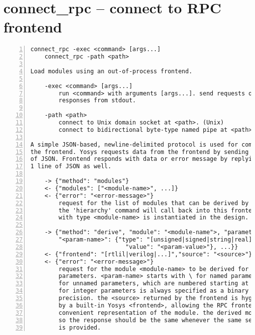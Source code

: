 \section{connect\_rpc -- connect to RPC frontend}
\label{cmd:connect_rpc}
\begin{lstlisting}[numbers=left,frame=single]
    connect_rpc -exec <command> [args...]
    connect_rpc -path <path>

Load modules using an out-of-process frontend.

    -exec <command> [args...]
        run <command> with arguments [args...]. send requests on stdin, read
        responses from stdout.

    -path <path>
        connect to Unix domain socket at <path>. (Unix)
        connect to bidirectional byte-type named pipe at <path>. (Windows)

A simple JSON-based, newline-delimited protocol is used for communicating with
the frontend. Yosys requests data from the frontend by sending exactly 1 line
of JSON. Frontend responds with data or error message by replying with exactly
1 line of JSON as well.

    -> {"method": "modules"}
    <- {"modules": ["<module-name>", ...]}
    <- {"error": "<error-message>"}
        request for the list of modules that can be derived by this frontend.
        the 'hierarchy' command will call back into this frontend if a cell
        with type <module-name> is instantiated in the design.

    -> {"method": "derive", "module": "<module-name">, "parameters": {
        "<param-name>": {"type": "[unsigned|signed|string|real]",
                           "value": "<param-value>"}, ...}}
    <- {"frontend": "[rtlil|verilog|...]","source": "<source>"}}
    <- {"error": "<error-message>"}
        request for the module <module-name> to be derived for a specific set of
        parameters. <param-name> starts with \ for named parameters, and with $
        for unnamed parameters, which are numbered starting at 1.<param-value>
        for integer parameters is always specified as a binary string of unlimited
        precision. the <source> returned by the frontend is hygienically parsed
        by a built-in Yosys <frontend>, allowing the RPC frontend to return any
        convenient representation of the module. the derived module is cached,
        so the response should be the same whenever the same set of parameters
        is provided.
\end{lstlisting}


